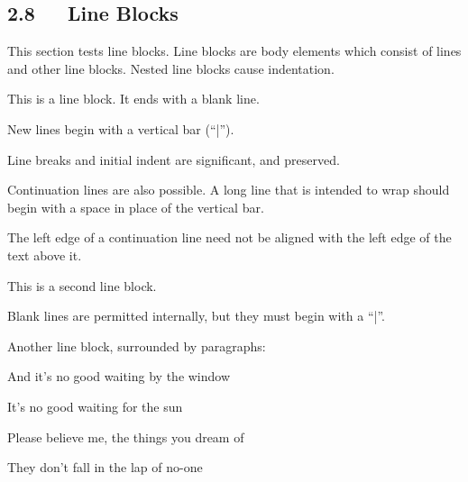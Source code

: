 \documentclass[a4paper]{article}
\begin{document}
\subsection{2.8   Line Blocks%
  \label{line-blocks}%
}

This section tests line blocks.  Line blocks are body elements which
consist of lines and other line blocks.  Nested line blocks cause
indentation.

\begin{DUlineblock}{0em}
\item[] This is a line block.  It ends with a blank line.
\item[]
\begin{DUlineblock}{\DUlineblockindent}
\item[] New lines begin with a vertical bar (“|”).
\item[] Line breaks and initial indent are significant, and preserved.
\item[]
\begin{DUlineblock}{\DUlineblockindent}
\item[] Continuation lines are also possible.  A long line that is intended
to wrap should begin with a space in place of the vertical bar.
\end{DUlineblock}
\item[] The left edge of a continuation line need not be aligned with
the left edge of the text above it.
\end{DUlineblock}
\end{DUlineblock}

\begin{DUlineblock}{0em}
\item[] This is a second line block.
\item[] 
\item[] Blank lines are permitted internally, but they must begin with a “|”.
\end{DUlineblock}

Another line block, surrounded by paragraphs:

\begin{DUlineblock}{0em}
\item[] And it’s no good waiting by the window
\item[] It’s no good waiting for the sun
\item[] Please believe me, the things you dream of
\item[] They don’t fall in the lap of no-one
\end{DUlineblock}
\end{document}
